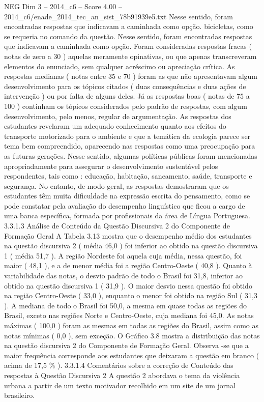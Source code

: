 \begin{textsample}{NEG Dim 3 – 2014\_c6 – Score 4.00 – 2014\_c6/enade\_2014\_tec\_an\_sist\_78b91939e5.txt}
Nesse sentido, foram encontradas respostas que indicavam a caminhada como opção. bicicletas, como se requeria no comando da questão.
Nesse sentido, foram encontradas respostas que indicavam a caminhada como opção.
Foram consideradas respostas fracas ( notas de zero a 30 ) aquelas meramente opinativas, ou que apenas transcreveram elementos do enunciado, sem qualquer acréscimo ou apreciação crítica.
As respostas medianas ( notas entre 35 e 70 ) foram as que não apresentavam algum desenvolvimento para os tópicos citados ( duas consequências e duas ações de intervenção ) ou por falta de alguns deles.
Já as respostas boas ( notas de 75 a 100 ) continham os tópicos considerados pelo padrão de respostas, com algum desenvolvimento, pelo menos, regular de argumentação.
As respostas dos estudantes revelaram um adequado conhecimento quanto aos efeitos do transporte motorizado para o ambiente e que a temática da ecologia parece ser tema bem compreendido, aparecendo nas respostas como uma preocupação para as futuras gerações.
Nesse sentido, algumas políticas públicas foram mencionadas apropriadamente para assegurar o desenvolvimento sustentável pelos respondentes, tais como : educação, habitação, saneamento, saúde, transporte e segurança.
No entanto, de modo geral, as respostas demostraram que os estudantes têm muita dificuldade na expressão escrita do pensamento, como se pode constatar pela avaliação do desempenho linguístico que ficou a cargo de uma banca específica, formada por profissionais da área de Língua Portuguesa. 3.3.1.3 Análise de Conteúdo da Questão Discursiva 2 do Componente de Formação Geral A Tabela 3.13 mostra que o desempenho médio dos estudantes na questão discursiva 2 ( média 46,0 ) foi inferior ao obtido na questão discursiva 1 ( média 51,7 ).
A região Nordeste foi aquela cuja média, nessa questão, foi maior ( 48,1 ), e a de menor média foi a região Centro-Oeste ( 40,8 ).
Quanto à variabilidade das notas, o desvio padrão de todo o Brasil foi 31,8, inferior ao obtido na questão discursiva 1 ( 31,9 ).
O maior desvio nessa questão foi obtido na região Centro-Oeste ( 33,0 ), enquanto o menor foi obtido na região Sul ( 31,3 ).
A mediana de todo o Brasil foi 50,0, a mesma em quase todas as regiões do Brasil, exceto nas regiões Norte e Centro-Oeste, cuja mediana foi 45,0.
As notas máximas ( 100,0 ) foram as mesmas em todas as regiões do Brasil, assim como as notas mínimas ( 0,0 ), sem exceção.
O Gráfico 3.8 mostra a distribuição das notas na questão discursiva 2 do Componente de Formação Geral.
Observa -se que a maior frequência corresponde aos estudantes que deixaram a questão em branco ( acima de 17,5 \% ). 3.3.1.4 Comentários sobre a correção de Conteúdo das respostas à Questão Discursiva 2 A questão 2 abordava o tema da violência urbana a partir de um texto motivador recolhido em um site de um jornal brasileiro.

\end{textsample}
